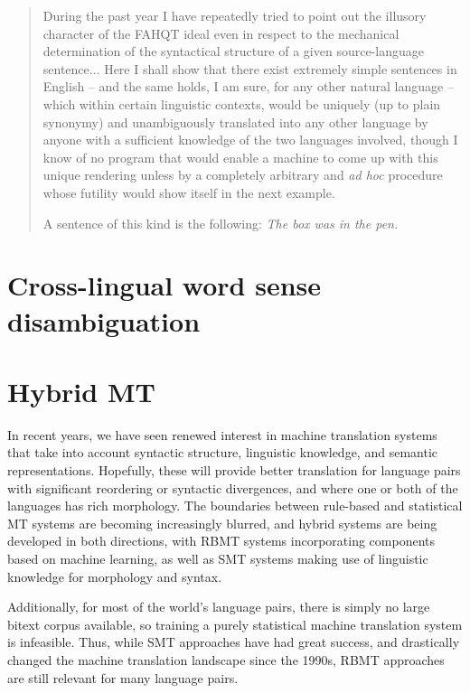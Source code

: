 \begin{quote}
During the past year I have repeatedly tried to point out the illusory
character of the FAHQT ideal even in respect to the mechanical determination of
the syntactical structure of a given source-language sentence... Here I shall
show that there exist extremely simple sentences in English -- and the same
holds, I am sure, for any other natural language -- which within certain
linguistic contexts, would be uniquely (up to plain synonymy) and unambiguously
translated into any other language by anyone with a sufficient knowledge of the
two languages involved, though I know of no program that would enable a machine
to come up with this unique rendering unless by a completely arbitrary and
\emph{ad hoc} procedure whose futility would show itself in the next example.

A sentence of this kind is the following: \emph{The box was in the pen.}
\end{quote}




\section{Cross-lingual word sense disambiguation}




\section{Hybrid MT}

In recent years, we have seen renewed interest in machine translation systems
that take into account syntactic structure, linguistic knowledge, and semantic
representations.
Hopefully, these will provide better translation for language pairs with
significant reordering or syntactic divergences, and where one or both of the
languages has rich morphology.
The boundaries between rule-based and statistical MT systems are becoming
increasingly blurred, and hybrid systems are being developed in both
directions, with RBMT systems incorporating components based on machine
learning, as well as SMT systems making use of linguistic knowledge for
morphology and syntax.

Additionally, for most of the world's language pairs, there is simply no large
bitext corpus available, so training a purely statistical machine translation
system is infeasible.
Thus, while SMT approaches have had great success, and drastically changed the
machine translation landscape since the 1990s, RBMT approaches are still
relevant for many language pairs.

